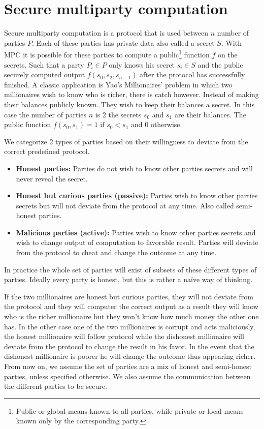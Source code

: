 \section{Secure multiparty computation}
\label{Secure multiparty computation}
Secure multiparty computation is a protocol that is used between $n$ number of parties $P$. Each of these parties has private data also called a secret $S$. With MPC it is possible for these parties to compute a public\footnote{Public or global means known to all parties, while private or local means known only by the corresponding party.} function $f$ on the secrets. Such that a party $P_i \in P$ only knows his secret $s_i \in S$ and the public securely computed output $f(s_0,s_2,s_{n-1})$ after the protocol has successfully finished.
\newline
A classic application is Yao's Millionaires' problem \cite{yao1982protocols} in which two millionaires wish to know who is richer, there is catch however. Instead of making their balances publicly known. They wish to keep their balances a secret. In this case the number of parties $n$ is 2 the secrets $s_0$ and $s_1$ are their balances. The public function $f(s_0,s_1)=1$ if $s_0<s_1$ and $0$ otherwise.

We categorize 2 types of parties based on their willingness to deviate from the correct predefined protocol.
\begin{itemize}
  \item \textbf{Honest parties:} Parties do not wish to know other parties secrets and will never reveal the secret.
  \item \textbf{Honest but curious parties (passive):} Parties wish to know other parties secrets but will not deviate from the protocol at any time. Also called semi-honest parties.
  \item \textbf{Malicious parties (active):} Parties wish to know other parties secrets and wish to change output of computation to favorable result. Parties will deviate from the protocol to cheat and change the outcome at any time.
\end{itemize}
In practice the whole set of parties will exist of subsets of these different types of parties. Ideally every party is honest, but this is rather a na\"ive way of thinking.


If the two millionaires are honest but curious parties, they will not deviate from the protocol and they will computer the correct output as a result they will know who is the richer millionaire but they won't know how much money the other one has. In the other case one of the two millionaires is corrupt and acts maliciously, the honest millionaire will follow protocol while the dishonest millionaire will deviate from the protocol to change the result in his favor. In the event that the dishonest millionaire is poorer he will change the outcome thus appearing richer.
From now on, we assume the set of parties are a mix of honest and semi-honest parties, unless specified otherwise. We also assume the communication between the different parties to be secure.

